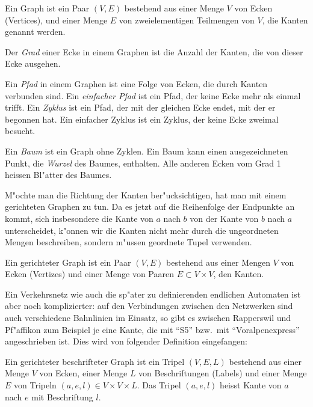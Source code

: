 \begin{definition}
\label{def_graph}
Ein Graph ist ein Paar $(V,E)$ bestehend aus einer Menge $V$ von Ecken
(Vertices),
und einer Menge $E$ von zweielementigen Teilmengen von $V$, die Kanten
genannt werden.
\end{definition}

Der {\em Grad} einer Ecke in einem Graphen ist die Anzahl der Kanten,
die von dieser Ecke ausgehen.

Ein {\em Pfad} in einem Graphen ist eine Folge von Ecken, die durch Kanten
verbunden sind.
Ein {\em einfacher Pfad} ist ein Pfad, der keine Ecke mehr
als einmal trifft.
Ein {\em Zyklus} ist ein Pfad, der mit der gleichen Ecke
endet, mit der er begonnen hat.
Ein einfacher Zyklus ist ein Zyklus,
der keine Ecke zweimal besucht.

Ein {\em Baum} ist ein Graph ohne Zyklen. Ein Baum kann einen ausgezeichneten
Punkt, die {\em Wurzel} des Baumes, enthalten. Alle anderen Ecken vom Grad 1
heissen Bl"atter des Baumes.

M"ochte man die Richtung der Kanten ber"ucksichtigen,
hat man mit einem gerichteten
Graphen zu tun. Da es jetzt auf die Reihenfolge der Endpunkte an kommt,
sich insbesondere die Kante von $a$ nach $b$ von der Kante von $b$ nach
$a$ unterscheidet, k"onnen wir die Kanten nicht mehr durch die ungeordneten
Mengen beschreiben, sondern m"ussen geordnete Tupel verwenden.

\begin{definition}
\label{def_gerichteter_graph}
Ein gerichteter Graph ist ein Paar $(V,E)$ bestehend aus einer
Mengen $V$ von Ecken (Vertizes) und einer Menge von Paaren $E\subset V\times V$,
den Kanten.
\end{definition}

Ein Verkehrsnetz wie auch die sp"ater zu definierenden endlichen
Automaten ist aber noch komplizierter: auf den Verbindungen zwischen
den Netzwerken sind auch verschiedene Bahnlinien im Einsatz, so gibt
es zwischen Rapperswil und Pf"affikon zum Beispiel je eine Kante, die
mit ``S5'' bzw.~mit ``Voralpenexpress'' angeschrieben ist. Dies
wird von folgender Definition eingefangen:

\begin{definition}
\label{def_gerichteter_beschrifteter_graph}
Ein gerichteter beschrifteter Graph ist ein Tripel $(V,E,L)$ bestehend
aus einer Menge $V$ von Ecken, einer Menge $L$ von Beschriftungen (Labels) und 
einer Menge $E$ von Tripeln $(a,e,l)\in V\times V\times L$. Das
Tripel $(a,e,l)$ heisst Kante von $a$ nach $e$ mit Beschriftung $l$.
\end{definition}


